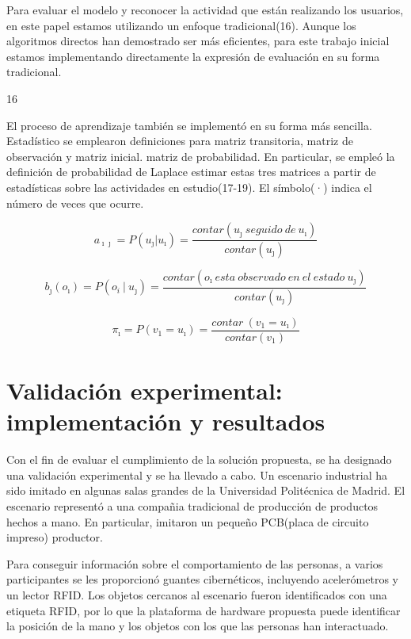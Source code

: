 \documentclass{article}
\begin{document}
Para evaluar el modelo y reconocer la actividad que están realizando los usuarios, en este papel estamos utilizando un enfoque tradicional(16). Aunque los algoritmos directos han demostrado ser más eficientes, para este trabajo inicial estamos implementando directamente la expresión de evaluación en su forma tradicional.

16

El proceso de aprendizaje también se implementó en su forma más sencilla. Estadístico se emplearon definiciones para matriz transitoria, matriz de observación y matriz inicial.
matriz de probabilidad. En particular, se empleó la definición de probabilidad de Laplace estimar estas tres matrices a partir de estadísticas sobre las actividades en estudio(17-19). El símbolo(·) indica el número de veces que ocurre.

\begin{equation} a_{\imath\jmath}  = P\left(u_\jmath  | u_\imath \right) = \frac{contar\left(u_\jmath \ seguido \ de \ u_\imath  \right) }{contar\left(u_\jmath \right) } \end{equation}

\begin{equation}b_\jmath\left(o_\imath \right) = P\left(o_i \ | \ u_\jmath \right)  = \frac{contar\left(o_\imath \ esta \ observado \  en \  el \  estado \ u_\jmath \right) }{contar\left(u_\jmath \right) }  \end{equation}

\begin{equation}\pi_\imath  = P\left(v_1 = u_\imath \right) = \frac{contar \ \left(v_1 = u_\imath \right)  }{contar\left(v_1\right) }  \end{equation}

\section {Validación experimental: implementación y resultados}
Con el fin de evaluar el cumplimiento de la solución propuesta, se ha designado una validación experimental y se ha llevado a cabo. Un escenario industrial ha sido imitado en algunas salas grandes de la Universidad Politécnica de Madrid. El escenario representó a una compañia tradicional de producción de productos hechos a mano. En particular, imitaron un pequeño PCB(placa de circuito impreso) productor.

Para conseguir información sobre el comportamiento de las personas, a varios participantes se les proporcionó guantes cibernéticos, incluyendo acelerómetros y un lector RFID. Los objetos cercanos al escenario fueron identificados con una etiqueta RFID, por lo que la plataforma de hardware propuesta puede identificar la posición de la mano y los objetos con los que las personas han interactuado.
\end{document}
